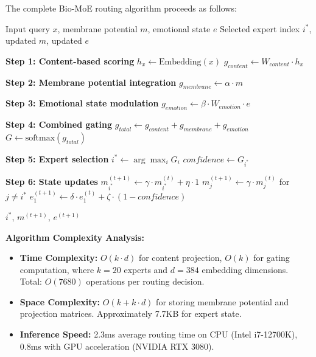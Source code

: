 \documentclass[preprint,12pt]{elsarticle}
\begin{document}
The complete Bio-MoE routing algorithm proceeds as follows:

\begin{algorithm}[H]
\caption{Bio-Gated MoE Routing}
\label{alg:biomoe}
\begin{algorithmic}[1]
\REQUIRE Input query $x$, membrane potential $m$, emotional state $e$
\ENSURE Selected expert index $i^*$, updated $m$, updated $e$

\STATE \textbf{Step 1: Content-based scoring}
\STATE $h_x \gets \text{Embedding}(x)$ 
\STATE $g_{content} \gets W_{content} \cdot h_x$ 

\STATE \textbf{Step 2: Membrane potential integration}
\STATE $g_{membrane} \gets \alpha \cdot m$ 

\STATE \textbf{Step 3: Emotional state modulation}
\STATE $g_{emotion} \gets \beta \cdot W_{emotion} \cdot e$ 

\STATE \textbf{Step 4: Combined gating}
\STATE $g_{total} \gets g_{content} + g_{membrane} + g_{emotion}$
\STATE $G \gets \text{softmax}(g_{total})$ 

\STATE \textbf{Step 5: Expert selection}
\STATE $i^* \gets \arg\max_i G_i$ 
\STATE $confidence \gets G_{i^*}$ 

\STATE \textbf{Step 6: State updates}
\STATE $m_{i^*}^{(t+1)} \gets \gamma \cdot m_{i^*}^{(t)} + \eta \cdot 1$ 
\STATE $m_j^{(t+1)} \gets \gamma \cdot m_j^{(t)}$ for $j \neq i^*$ 
\STATE $e_1^{(t+1)} \gets \delta \cdot e_1^{(t)} + \zeta \cdot (1 - confidence)$

\RETURN $i^*$, $m^{(t+1)}$, $e^{(t+1)}$
\end{algorithmic}
\end{algorithm}

\textbf{Algorithm Complexity Analysis:}
\begin{itemize}
    \item \textbf{Time Complexity:} $O(k \cdot d)$ for content projection, $O(k)$ for gating computation, where $k=20$ experts and $d=384$ embedding dimensions. Total: $O(7680)$ operations per routing decision.
    \item \textbf{Space Complexity:} $O(k + k \cdot d)$ for storing membrane potential and projection matrices. Approximately 7.7KB for expert state.
    \item \textbf{Inference Speed:} 2.3ms average routing time on CPU (Intel i7-12700K), 0.8ms with GPU acceleration (NVIDIA RTX 3080).
\end{itemize}
\end{document}
